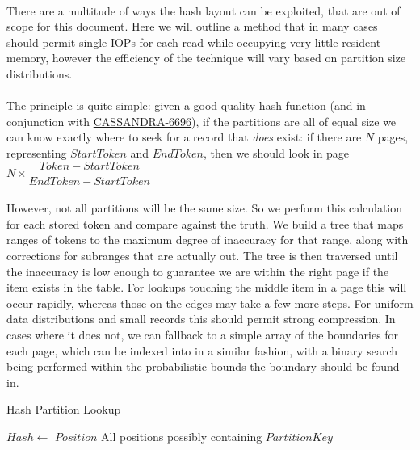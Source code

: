 \documentclass[fleqn]{article}
\begin{document}
\paragraph{}
    There are a multitude of ways the hash layout can be exploited, that are out of scope for this document. 
    Here we will outline
    a method that in many cases should permit single IOPs for each read while occupying very little 
    resident memory, however the efficiency of the technique will vary based on partition size distributions.
    \\\\
    The principle is quite simple: given a good quality hash function (and in conjunction with 
    \href{https://issues.apache.org/jira/browse/CASSANDRA-6696}{CASSANDRA-6696}), if the partitions are
    all of equal size we can know exactly where to seek for a record that \textit{does} exist: if there
    are $N$ pages, representing $StartToken$ and $EndToken$, then we should look in page $N \times \dfrac{Token - StartToken}{EndToken - StartToken}$
    \\\\
    However, not all partitions will be the same size. So we perform this calculation for each stored token
    and compare against the truth. We build a tree that maps ranges of tokens to the maximum degree 
    of inaccuracy for that range, along with corrections for subranges that are actually out. The tree is
    then traversed until the inaccuracy is low enough to guarantee we are within the right page if the item
    exists in the table. For lookups touching the middle item in a page this will occur rapidly, whereas those
    on the edges may take a few more steps. For uniform data distributions and small records this should 
    permit strong compression. In cases where it does not, we can fallback to a simple array of the boundaries
    for each page, which can be indexed into in a similar fashion, with a binary search being performed within
    the probabilistic bounds the boundary should be found in.
\begin{algorithm}
\scriptsize
\caption{Hash Partition Lookup}
\begin{algorithmic}[2]
\State $Hash \gets $ 
\State $Position$
\State \Return All positions possibly containing $PartitionKey$
\EndFunction

\end{algorithmic}
\end{algorithm}
    
\end{document}
